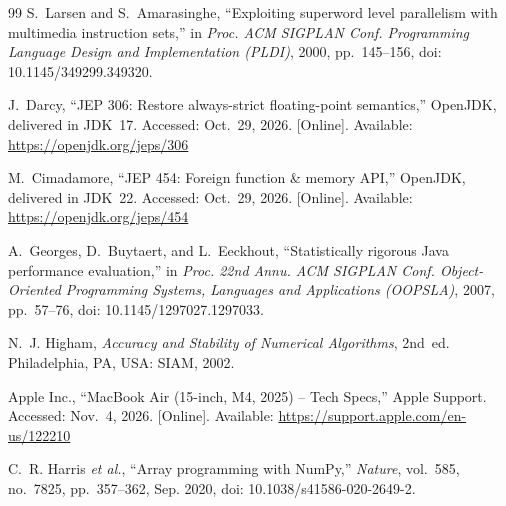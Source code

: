 \documentclass[11pt,a4paper]{article}
\begin{document}
\begin{thebibliography}{99}
S.~Larsen and S.~Amarasinghe, ``Exploiting superword level parallelism with
multimedia instruction sets,'' in \emph{Proc. ACM SIGPLAN Conf. Programming
Language Design and Implementation (PLDI)}, 2000, pp.~145--156,
doi: 10.1145/349299.349320.

J.~Darcy, ``JEP 306: Restore always-strict floating-point semantics,''
OpenJDK, delivered in JDK~17. Accessed: Oct.~29, 2026. [Online]. Available:
\url{https://openjdk.org/jeps/306}

M.~Cimadamore, ``JEP 454: Foreign function \& memory API,'' OpenJDK, delivered
in JDK~22. Accessed: Oct.~29, 2026. [Online]. Available:
\url{https://openjdk.org/jeps/454}

A.~Georges, D.~Buytaert, and L.~Eeckhout, ``Statistically rigorous Java
performance evaluation,'' in \emph{Proc. 22nd Annu. ACM SIGPLAN Conf.
Object-Oriented Programming Systems, Languages and Applications (OOPSLA)},
2007, pp.~57--76, doi: 10.1145/1297027.1297033.

N.~J. Higham, \emph{Accuracy and Stability of Numerical Algorithms}, 2nd~ed.
Philadelphia, PA, USA: SIAM, 2002.

Apple Inc., ``MacBook Air (15-inch, M4, 2025) -- Tech Specs,'' Apple Support.
Accessed: Nov.~4, 2026. [Online]. Available:
\url{https://support.apple.com/en-us/122210}

C.~R. Harris \emph{et al.}, ``Array programming with NumPy,'' \emph{Nature},
vol.~585, no.~7825, pp.~357--362, Sep. 2020, doi: 10.1038/s41586-020-2649-2.

\end{thebibliography}
\end{document}
